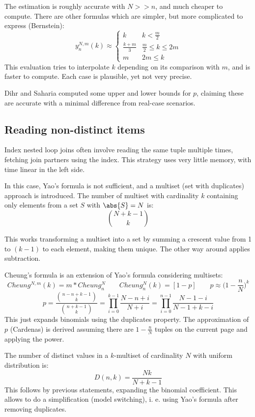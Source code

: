The estimation is roughly accurate with $N >> n$, and much cheaper to compute. There are other formulas which are simpler, but more complicated to express (Bernstein):
$$y_n^{N,m}(k) \approx \begin{cases}
	k & k < \frac{m}{2} \\
	\frac{k+m}{3} & \frac{m}{2} \leq k \leq 2m \\
	m & 2m \leq k
\end{cases}$$
This evaluation tries to interpolate $k$ depending on its comparison with $m$, and is faster to compute. Each case is plausible, yet not very precise. 

Dihr and Saharia computed some upper and lower bounds for $p$, claiming these are accurate with a minimal difference from real-case scenarios.

\subsection{Reading non-distinct items}
Index nested loop joins often involve reading the same tuple multiple times, fetching join partners using the index. This strategy uses very little memory, with time linear in the left side.

In this case, Yao's formula is not sufficient, and a multiset (set with duplicates) approach is introduced. The number of multiset with cardinality $k$ containing only elements from a set $S$ with $\abs{S} = N$ is:
$${N+k-1}\choose{k}$$

This works transforming a multiset into a set by summing a crescent value from 1 to $(k-1)$ to each element, making them unique. The other way around applies subtraction. 

Cheung's formula is an extension of Yao's formula considering multisets:
$$Cheung^{N, m}(k) = m * Cheung^N_n \qquad Cheung^N_n(k) = [1 - p] \qquad p \approx \Big( 1 - \frac{n}{N}\Big)^k$$
$$p = \frac{{n-n+k-1\choose k}}{{n+k-1\choose k}} = \prod_{i=0}^{k-1} \frac{N-n+i}{N+i} = \prod_{i=0}^{n-1} \frac{N-1-i}{N-1+k-i}$$
This just expands binomials using the duplicates property. The approximation of $p$ (Cardenas) is derived assuming there are $1 - \frac{n}{N}$ tuples on the current page and applying the power.

The number of distinct values in a $k$-multiset of cardinality $N$ with uniform distribution is:
$$D(n, k) = \frac{Nk}{N + k - 1}$$
This follows by previous statements, expanding the binomial coefficient. This allows to do a simplification (model switching), i. e. using Yao's formula after removing duplicates. 

